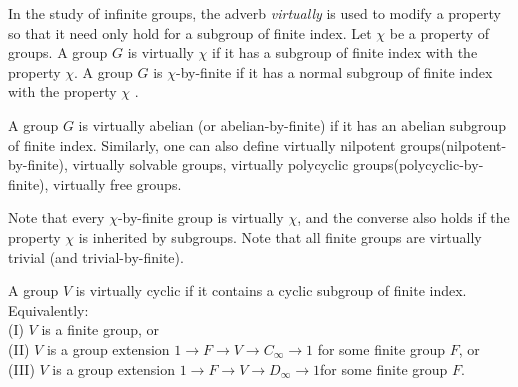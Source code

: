 In the study of infinite groups, the adverb \emph{virtually} is used to modify a property so that it need only hold for a subgroup of finite index. Let $\chi$ be a property of groups. A group $G$ is virtually $\chi$ if it has a subgroup of finite index with the property $\chi$. A group $G$ is $\chi$-by-finite if it has a normal subgroup of finite index with the property $\chi$ \cite{Schneebeli1978}. 
\begin{definition}
A group $G$ is virtually abelian (or abelian-by-finite)  if it has an abelian subgroup of finite index. Similarly, one can also define virtually nilpotent groups(nilpotent-by-finite), virtually solvable groups, virtually polycyclic groups(polycyclic-by-finite), virtually free groups. 
\end{definition}
Note that every $\chi$-by-finite group is virtually $\chi$, and the converse also holds if the property $\chi$ is inherited by subgroups. Note that all finite groups are virtually trivial (and trivial-by-finite).
\begin{definition}
	A group $V$ is virtually cyclic if it contains a cyclic subgroup of finite index. Equivalently:\\
(I) $V$ is a finite group, or\\
(II) $V$ is a group extension $1 \longrightarrow F \longrightarrow V \longrightarrow C_{\infty} \longrightarrow 1$ for some finite group $F$, or\\
(III) $V$ is a group extension $1 \longrightarrow F \longrightarrow V \longrightarrow D_{\infty} \longrightarrow 1 $for some finite group $F$.
\end{definition}

